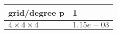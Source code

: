 \begin{tabular}{ll}
\hline
 grid/degree p         & 1          \\
\hline
 $4 \times 4 \times 4$ & $1.15e-03$ \\
\hline
\end{tabular}